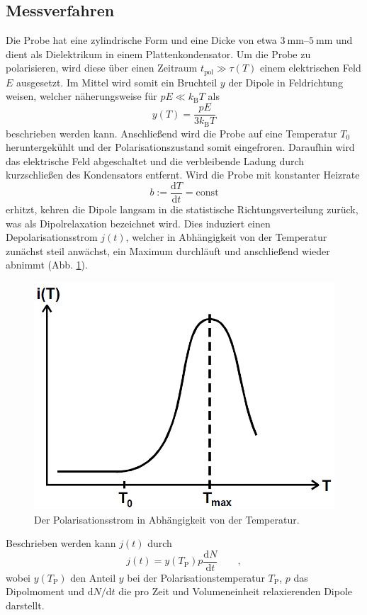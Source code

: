 \subsection{Messverfahren} %
\label{sub:messverfahren}

Die Probe hat eine zylindrische Form und eine Dicke von etwa $\SIrange{3}{5}{\milli\meter}$ und dient als Dielektrikum in einem Plattenkondensator.
Um die Probe zu polarisieren, wird diese über einen Zeitraum $t_{\text{pol}} \gg \tau(T)$ einem elektrischen Feld $E$ ausgesetzt.
Im Mittel wird somit ein Bruchteil $y$ der Dipole in Feldrichtung weisen, welcher näherungsweise für $pE \ll k_\text{B} T$ als
\begin{equation}
    y(T) = \frac{p E}{3 k_\text{B} T} \label{y_t}
\end{equation}
beschrieben werden kann.
Anschließend wird die Probe auf eine Temperatur $T_0$ heruntergekühlt und der Polarisationszustand somit eingefroren.
Daraufhin wird das elektrische Feld abgeschaltet und die verbleibende Ladung durch kurzschließen des Kondensators entfernt.
Wird die Probe mit konstanter Heizrate
\begin{equation}
    b := \frac{\mathrm{d}T}{\mathrm{d}t} = \text{const}
\end{equation}
erhitzt, kehren die Dipole langsam in die statistische Richtungsverteilung zurück, was als Dipolrelaxation bezeichnet wird.
Dies induziert einen Depolarisationsstrom $j(t)$, welcher in Abhängigkeit von der Temperatur zunächst steil anwächst, ein Maximum durchläuft und anschließend wieder abnimmt (Abb. \ref{fig:pol_strom}).
\begin{figure}
    \centering
    \includegraphics[width = 0.5\linewidth]{data/pol_strom.PNG}
    \caption{Der Polarisationsstrom in Abhängigkeit von der Temperatur.}
    \label{fig:pol_strom}
\end{figure}
Beschrieben werden kann $j(t)$ durch
\begin{equation}
    j(t) = y(T_\mathrm{P}) p \frac{\mathrm{d}N}{\mathrm{d}t} \qquad,
\end{equation}
wobei $y(T_\mathrm{P})$ den Anteil $y$ bei der Polarisationstemperatur $T_\mathrm{P}$, $p$ das Dipolmoment und $\mathrm{d}N/\mathrm{d}t$ die pro Zeit und Volumeneinheit relaxierenden Dipole darstellt.

